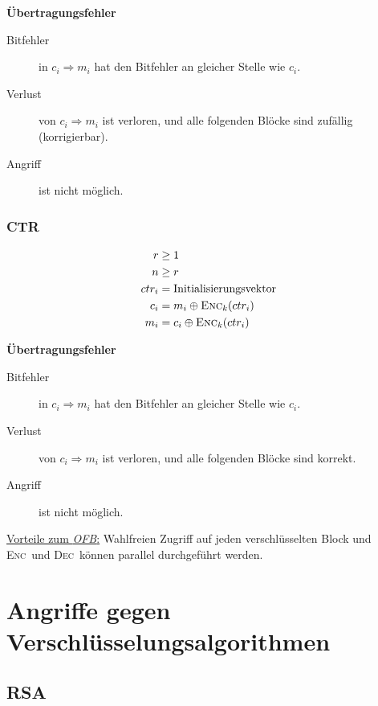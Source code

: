 \documentclass[a4paper,landscape]{article}
\newcommand{\plaint}{\ensuremath{m}}
\newcommand{\ciphert}{\ensuremath{c}}
\newcommand{\enc}{\textsc{Enc}}
\newcommand{\dec}{\textsc{Dec}}
\begin{document}
\begin{multicols*}{4}
	\textbf{Übertragungsfehler}
	\begin{description}
		\item[Bitfehler] in \(\ciphert_{i} \Rightarrow \plaint_{i}\) hat den
		      Bitfehler an gleicher Stelle wie \(\ciphert_{i}\).
		\item[Verlust] von \(\ciphert_{i} \Rightarrow \plaint_{i}\) ist verloren,
		      und alle folgenden Blöcke sind zufällig (korrigierbar).
		\item[Angriff] ist nicht möglich.
	\end{description}

	\subsubsection{CTR}
	\begin{align*}
		r            & \geq 1                                  \\
		n            & \geq r                                  \\
		ctr_{i}      & =  \text{Initialisierungsvektor}        \\
		\ciphert_{i} & = \plaint_{i} \oplus \enc_{k}(ctr_{i})  \\
		\plaint_{i}  & = \ciphert_{i} \oplus \enc_{k}(ctr_{i})
	\end{align*}

	\textbf{Übertragungsfehler}
	\begin{description}
		\item[Bitfehler] in \(\ciphert_{i} \Rightarrow \plaint_{i}\) hat den
		      Bitfehler an gleicher Stelle wie \(\ciphert_{i}\).
		\item[Verlust] von \(\ciphert_{i} \Rightarrow \plaint_{i}\) ist verloren,
		      und alle folgenden Blöcke sind korrekt.
		\item[Angriff] ist nicht möglich.
	\end{description}
	\underline{Vorteile zum \emph{OFB}:} Wahlfreien Zugriff auf jeden
	verschlüsselten Block und \enc\ und \dec\ können parallel durchgeführt
	werden.

	\section{Angriffe gegen Verschlüsselungsalgorithmen}
	\subsection{RSA}

\end{multicols*}
\end{document}
